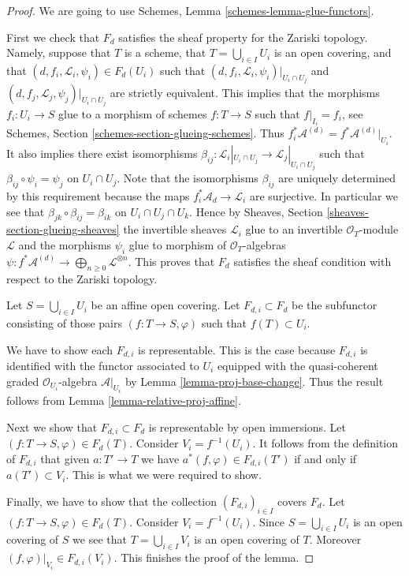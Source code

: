 \begin{proof}
We are going to use Schemes, Lemma \ref{schemes-lemma-glue-functors}.

\medskip\noindent
First we check that $F_d$ satisfies the sheaf property for the
Zariski topology. Namely, suppose that $T$ is a scheme,
that $T = \bigcup_{i \in I} U_i$ is an open covering,
and that $(d, f_i, \mathcal{L}_i, \psi_i) \in F_d(U_i)$ such that
$(d, f_i, \mathcal{L}_i, \psi_i)|_{U_i \cap U_j}$ and
$(d, f_j, \mathcal{L}_j, \psi_j)|_{U_i \cap U_j}$ are strictly
equivalent. This implies that the morphisms $f_i : U_i \to S$
glue to a morphism of schemes $f : T \to S$ such that
$f|_{I_i} = f_i$, see Schemes, Section \ref{schemes-section-glueing-schemes}.
Thus $f_i^*\mathcal{A}^{(d)} = f^*\mathcal{A}^{(d)}|_{U_i}$.
It also implies there exist isomorphisms
$\beta_{ij} : \mathcal{L}_i|_{U_i \cap U_j} \to \mathcal{L}_j|_{U_i \cap U_j}$
such that $\beta_{ij} \circ \psi_i = \psi_j$ on $U_i \cap U_j$.
Note that the isomorphisms $\beta_{ij}$ are uniquely determined
by this requirement because the maps $f_i^*\mathcal{A}_d \to \mathcal{L}_i$
are surjective. In particular we see that
$\beta_{jk} \circ \beta_{ij} = \beta_{ik}$ on $U_i \cap U_j \cap U_k$.
Hence by Sheaves,
Section \ref{sheaves-section-glueing-sheaves} the invertible sheaves
$\mathcal{L}_i$ glue to an invertible $\mathcal{O}_T$-module
$\mathcal{L}$ and the morphisms $\psi_i$ glue to
morphism of $\mathcal{O}_T$-algebras
$\psi : f^*\mathcal{A}^{(d)} \to \bigoplus_{n \geq 0} \mathcal{L}^{\otimes n}$.
This proves that $F_d$ satisfies the sheaf condition with respect to
the Zariski topology.

\medskip\noindent
Let $S = \bigcup_{i \in I} U_i$ be an affine open covering.
Let $F_{d, i} \subset F_d$ be the subfunctor consisting of
those pairs $(f : T \to S, \varphi)$ such that
$f(T) \subset U_i$.

\medskip\noindent
We have to show each $F_{d, i}$ is representable.
This is the case because $F_{d, i}$ is identified with
the functor associated to $U_i$ equipped with
the quasi-coherent graded $\mathcal{O}_{U_i}$-algebra
$\mathcal{A}|_{U_i}$ by Lemma \ref{lemma-proj-base-change}.
Thus the result follows from Lemma \ref{lemma-relative-proj-affine}.

\medskip\noindent
Next we show that $F_{d, i} \subset F_d$ is representable by open immersions.
Let $(f : T \to S, \varphi) \in F_d(T)$. Consider $V_i = f^{-1}(U_i)$.
It follows from the definition of $F_{d, i}$ that given $a : T' \to T$
we have $a^*(f, \varphi) \in F_{d, i}(T')$ if and only if $a(T') \subset V_i$.
This is what we were required to show.

\medskip\noindent
Finally, we have to show that the collection $(F_{d, i})_{i \in I}$
covers $F_d$. Let $(f : T \to S, \varphi) \in F_d(T)$.
Consider $V_i = f^{-1}(U_i)$. Since $S = \bigcup_{i \in I} U_i$
is an open covering of $S$ we see that $T = \bigcup_{i \in I} V_i$
is an open covering of $T$. Moreover $(f, \varphi)|_{V_i} \in F_{d, i}(V_i)$.
This finishes the proof of the lemma.
\end{proof}

